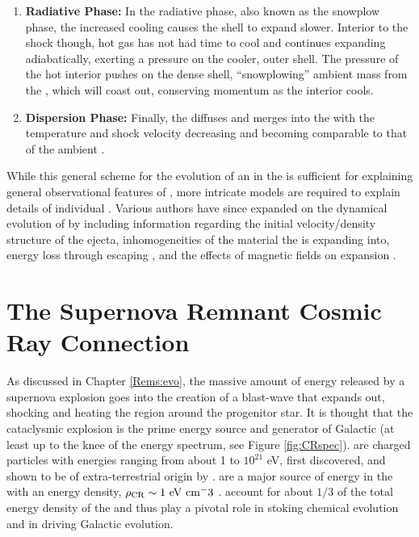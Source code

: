 \begin{enumerate}
	\item \textbf{Radiative Phase:} In the radiative phase, also known as the snowplow phase, the increased cooling causes the \snr{} shell to expand slower. Interior to the shock though, hot gas has not had time to cool and continues expanding adiabatically, exerting a pressure on the cooler, outer shell. The pressure of the hot interior pushes on the dense shell,  ``snowplowing'' ambient mass from the \ism{}, which will coast out, conserving momentum as the interior cools. 
	\item \textbf{Dispersion Phase:} Finally, the \snr{} diffuses and merges into the \ism{} with the temperature and shock velocity decreasing and becoming comparable to that of the ambient \ism{}.
\end{enumerate}

While this general scheme for the evolution of an \snr{} in the \ism{} is sufficient for explaining general observational features of \snrs{}, more intricate models are required to explain details of individual \snrs{}. Various authors have since expanded on the dynamical evolution of \snrs{} by including information regarding the initial velocity/density structure of the ejecta, inhomogeneities of the material the \snr{} is expanding into, energy loss through escaping \crs{}, and the effects of magnetic fields on expansion \citep[and references in \cite{Vink12} which reviews various analytic ]{Chevalier74,Chevalier82,Truelove99}.
  
\section{\label{Rems:CR}The Supernova Remnant Cosmic Ray Connection}

As discussed in Chapter \ref{Rems:evo}, the massive amount of energy released by a supernova explosion goes into the creation of a blast-wave that expands out, shocking and heating the region around the progenitor star. It is thought that the cataclysmic explosion is the prime energy source and generator of Galactic \crs{} (at least up to the knee of the \cray{} energy spectrum, see Figure \ref{fig:CRspec}).  \crs{} are charged particles with energies ranging from about 1\mev{} to $10^{21}$ eV, first discovered, and shown to be of extra-terrestrial origin by \cite{Hess12}. \crs{} are a major source of energy in the \ism{} with an energy density,  ${\rm \rho_{CR} \sim 1~eV~cm^-3}$ \citep{Blasi13,Horandel08}. \crs{} account for about $1/3$ of the total energy density of the \ism{} and thus play a pivotal role in stoking chemical evolution and in  driving Galactic evolution. 

